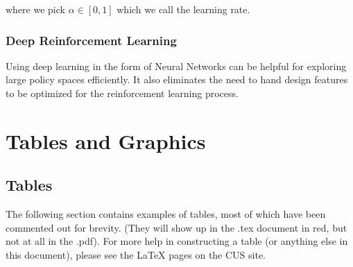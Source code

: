 \documentclass[12pt,twoside]{reedthesis}
\begin{document}
where we pick $\alpha \in [0,1]$ which we call the learning rate.

\subsection{Deep Reinforcement Learning}
Using deep learning in the form of Neural Networks can be helpful for exploring large policy spaces efficiently. It also eliminates the need to hand design features to be optimized for the reinforcement learning process. \cite{Shoham2008} 



\chapter{Tables and Graphics}

\section{Tables}
	The following section contains examples of tables, most of which have been commented out for brevity. (They will show up in the .tex document in red, but not at all in the .pdf). For more help in constructing a table (or anything else in this document), please see the LaTeX pages on the CUS site. 
\end{document}
